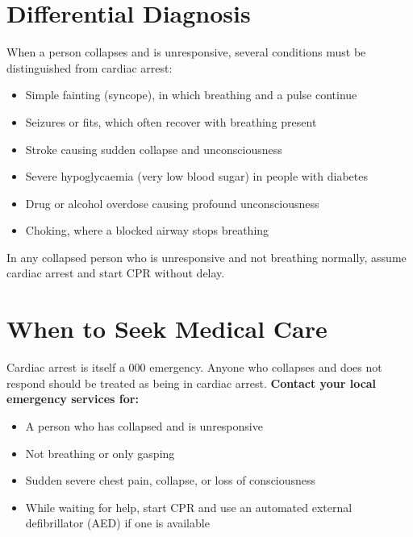 \section*{Differential Diagnosis}
When a person collapses and is unresponsive, several conditions must be distinguished from cardiac arrest:
\begin{itemize}
    \item Simple fainting (syncope), in which breathing and a pulse continue
    \item Seizures or fits, which often recover with breathing present
    \item Stroke causing sudden collapse and unconsciousness
    \item Severe hypoglycaemia (very low blood sugar) in people with diabetes
    \item Drug or alcohol overdose causing profound unconsciousness
    \item Choking, where a blocked airway stops breathing
\end{itemize}
In any collapsed person who is unresponsive and not breathing normally, assume cardiac arrest and start CPR without delay.

\section*{When to Seek Medical Care}
Cardiac arrest is itself a 000 emergency. Anyone who collapses and does not respond should be treated as being in cardiac arrest.
\textbf{Contact your local emergency services for:}
\begin{itemize}
    \item A person who has collapsed and is unresponsive
    \item Not breathing or only gasping
    \item Sudden severe chest pain, collapse, or loss of consciousness
    \item While waiting for help, start CPR and use an automated external defibrillator (AED) if one is available
\end{itemize}

